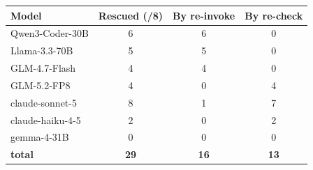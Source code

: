 \begin{tabular}{@{}l c c c@{}}
\hline
\textbf{Model} & \textbf{Rescued (/8)} & \textbf{By re-invoke} & \textbf{By re-check} \\
\hline
Qwen3-Coder-30B & 6 & 6 & 0 \\
Llama-3.3-70B & 5 & 5 & 0 \\
GLM-4.7-Flash & 4 & 4 & 0 \\
GLM-5.2-FP8 & 4 & 0 & 4 \\
claude-sonnet-5 & 8 & 1 & 7 \\
claude-haiku-4-5 & 2 & 0 & 2 \\
gemma-4-31B & 0 & 0 & 0 \\
\hline
\textbf{total} & \textbf{29} & \textbf{16} & \textbf{13} \\
\hline
\end{tabular}
